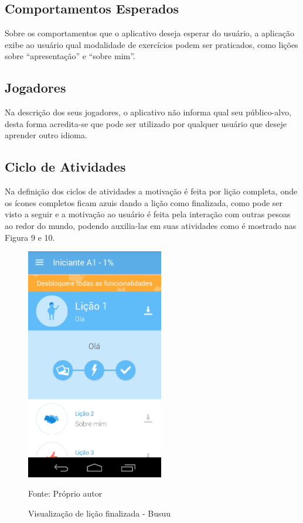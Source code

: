 \documentclass[
	12pt,				%
	openany,			%
	oneside,			%
	a4paper,			%
	english,			%
	french,				%
	spanish,			%
	brazil				%
	]{abntex2}
\begin{document}
\subsection{Comportamentos Esperados}
	Sobre os comportamentos que o aplicativo deseja esperar do usuário, a aplicação exibe ao usuário qual modalidade de exercícios podem ser praticados, como lições sobre “apresentação” e “sobre mim”.

\subsection{Jogadores}
Na descrição dos seus jogadores, o aplicativo não informa qual seu público-alvo, desta forma acredita-se que pode ser utilizado por qualquer usuário que deseje aprender outro idioma.

\subsection{Ciclo de Atividades}
	Na definição dos ciclos de atividades a motivação é feita por lição completa, onde os ícones completos ficam azuis dando a lição como finalizada, como pode ser visto a seguir e a motivação ao usuário é feita pela interação com outras pesoas ao redor do mundo, podendo auxilia-las em suas atividades como é mostrado nas Figura 9 e 10.

\begin{figure}[H]
    \centering
\caption{Visualização de lição finalizada - Busuu}
\includegraphics[width=6cm]{figuras/ciclobusuu.png}
\par
 Fonte: Próprio autor
\end{figure}
\end{document}
